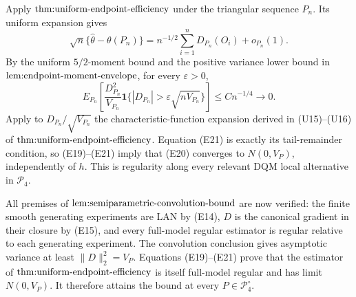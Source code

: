 Apply \(\textnormal{thm:uniform-endpoint-efficiency}\) under the triangular sequence \(P_n\).  Its uniform expansion gives
\[
 \sqrt n\{\widehat\theta-\theta(P_n)\}
 =n^{-1/2}\sum_{i=1}^nD_{P_n}(O_i)+o_{P_n}(1).                         \tag{E20}
\]
By the uniform \(5/2\)-moment bound and the positive variance lower bound in \(\textnormal{lem:endpoint-moment-envelope}\), for every \(\varepsilon>0\),
\[
 E_{P_n}\!\left[\frac{D_{P_n}^2}{V_{P_n}}
  \mathbf 1\{|D_{P_n}|>\varepsilon\sqrt{nV_{P_n}}\}\right]
 \le Cn^{-1/4}\longrightarrow0.                                      \tag{E21}
\]
Apply to \(D_{P_n}/\sqrt{V_{P_n}}\) the characteristic-function expansion derived in (U15)--(U16) of \(\textnormal{thm:uniform-endpoint-efficiency}\).  Equation (E21) is exactly its tail-remainder condition, so (E19)--(E21) imply that (E20) converges to \(N(0,V_P)\), independently of \(h\).  This is regularity along every relevant DQM local alternative in \(\mathcal P_4\).

All premises of \(\textnormal{lem:semiparametric-convolution-bound}\) are now verified: the finite smooth generating experiments are LAN by (E14), \(D\) is the canonical gradient in their closure by (E15), and every full-model regular estimator is regular relative to each generating experiment.  The convolution conclusion gives asymptotic variance at least \(\lVert D\rVert_2^2=V_P\).  Equations (E19)--(E21) prove that the estimator of \(\textnormal{thm:uniform-endpoint-efficiency}\) is itself full-model regular and has limit \(N(0,V_P)\).  It therefore attains the bound at every \(P\in\mathcal P_4^{\circ}\).

